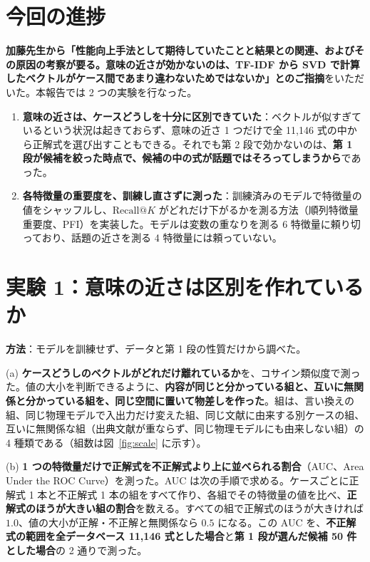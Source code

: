 \documentclass[a4j,dvipdfmx,11pt]{jresume}
\makeatletter
\newcommand{\rk}{\textrm{Recall@}K}
\makeatother
\begin{document}
\section{今回の進捗}
\textbf{加藤先生から「性能向上手法として期待していたことと結果との関連、およびその原因の考察が要る。意味の近さが効かないのは、TF-IDF から SVD で計算したベクトルがケース間であまり違わないためではないか」とのご指摘}をいただいた。本報告では 2 つの実験を行なった。

\begin{enumerate}[leftmargin=1.8em]
  \item \textbf{意味の近さは、ケースどうしを十分に区別できていた}：ベクトルが似すぎているという状況は起きておらず、意味の近さ 1 つだけで全 11{,}146 式の中から正解式を選び出すこともできる。それでも第 2 段で効かないのは、\textbf{第 1 段が候補を絞った時点で、候補の中の式が話題ではそろってしまうから}であった。
  \item \textbf{各特徴量の重要度を、訓練し直さずに測った}：訓練済みのモデルで特徴量の値をシャッフルし、$\rk$ がどれだけ下がるかを測る方法（順列特徴量重要度、PFI）を実装した。モデルは変数の重なりを測る 6 特徴量に頼り切っており、話題の近さを測る 4 特徴量には頼っていない。
\end{enumerate}

\section{実験 1：意味の近さは区別を作れているか}\label{sec:exp1}
\textbf{方法}：モデルを訓練せず、データと第 1 段の性質だけから調べた。

(a) \textbf{ケースどうしのベクトルがどれだけ離れているか}を、コサイン類似度で測った。値の大小を判断できるように、\textbf{内容が同じと分かっている組と、互いに無関係と分かっている組を、同じ空間に置いて物差しを作った}。組は、言い換えの組、同じ物理モデルで入出力だけ変えた組、同じ文献に由来する別ケースの組、互いに無関係な組（出典文献が重ならず、同じ物理モデルにも由来しない組）の 4 種類である（組数は図~\ref{fig:scale} に示す）。

(b) \textbf{1 つの特徴量だけで正解式を不正解式より上に並べられる割合}（AUC、Area Under the ROC Curve）を測った。AUC は次の手順で求める。ケースごとに正解式 1 本と不正解式 1 本の組をすべて作り、各組でその特徴量の値を比べ、\textbf{正解式のほうが大きい組の割合}を数える。すべての組で正解式のほうが大きければ $1.0$、値の大小が正解・不正解と無関係なら $0.5$ になる。この AUC を、\textbf{不正解式の範囲を全データベース 11{,}146 式とした場合}と\textbf{第 1 段が選んだ候補 50 件とした場合}の 2 通りで測った。
\end{document}
